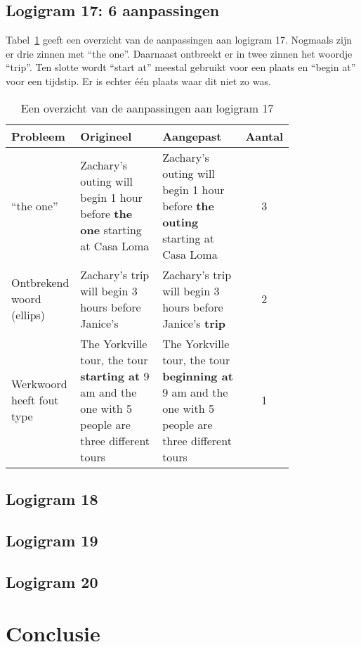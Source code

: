 \subsection{Logigram 17: 6 aanpassingen}
Tabel~\ref{tbl:log17} geeft een overzicht van de aanpassingen aan logigram 17. Nogmaals zijn er drie zinnen met ``the one''. Daarnaast ontbreekt er in twee zinnen het woordje ``trip''. Ten slotte wordt ``start at'' meestal gebruikt voor een plaats en ``begin at'' voor een tijdstip. Er is echter één plaats waar dit niet zo was.

\begin{table}[h]
  \centering
  \begin{tabular}{p{0.2\linewidth}p{0.3\linewidth}p{0.3\linewidth}c}
    \toprule
    \textbf{Probleem} & \textbf{Origineel} & \textbf{Aangepast} & \textbf{Aantal} \\ 
    \hline
    ``the one'' & Zachary's outing will begin 1 hour before \textbf{the one} starting at Casa Loma & Zachary's outing will begin 1 hour before \textbf{the outing} starting at Casa Loma & 3 \\
    \hline
    Ontbrekend woord (ellips) & Zachary's trip will begin 3 hours before Janice's & Zachary's trip will begin 3 hours before Janice's \textbf{trip} & 2 \\
    \hline
    Werkwoord heeft fout type & The Yorkville tour, the tour \textbf{starting at} 9 am and the one with 5 people are three different tours & The Yorkville tour, the tour \textbf{beginning at} 9 am and the one with 5 people are three different tours & 1 \\ 
    \bottomrule
  \end{tabular}
  \caption{Een overzicht van de aanpassingen aan logigram 17}
  \label{tbl:log17}
\end{table}

\subsection{Logigram 18}
\subsection{Logigram 19}
\subsection{Logigram 20}


\section{Conclusie}
